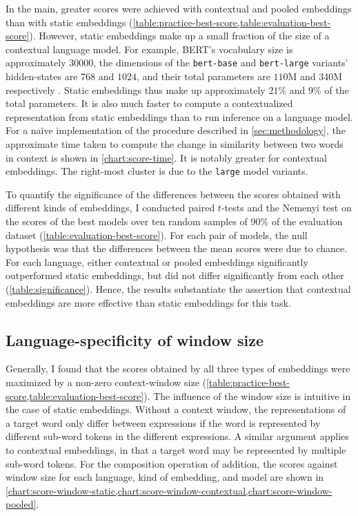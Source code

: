In the main, greater scores were achieved with contextual and pooled embeddings than
with static embeddings (\cref{table:practice-best-score,table:evaluation-best-score}).
However, static embeddings make up a small fraction of the size of a contextual
language model.
For example, BERT's vocabulary size is approximately $30000$, the dimensions of the
\texttt{bert-base} and \texttt{bert-large} variants' hidden-states are $768$ and
$1024$, and their total parameters are $110$M and $340$M respectively
\parencite[4173-4174]{Devlin2019}.
Static embeddings thus make up approximately $21$\% and $9$\% of the total parameters.
It is also much faster to compute a contextualized representation from static
embeddings than to run inference on a language model.
For a naïve implementation of the procedure described in \cref{sec:methodology}, the
approximate time taken to compute the change in similarity between two words in context
is shown in \cref{chart:score-time}.
It is notably greater for contextual embeddings.
The right-most cluster is due to the \texttt{large} model variants.



To quantify the significance of the differences between the scores obtained with
different kinds of embeddings, I conducted paired $t$-tests and the Nemenyi test
\parencites{Nemenyi1963}{Demsar2006} on the scores of the best models over ten random
samples of 90\% of the evaluation dataset (\cref{table:evaluation-best-score}).
For each pair of models, the null hypothesis was that the differences between the mean
scores were due to chance.
For each language, either contextual or pooled embeddings significantly outperformed
static embeddings, but did not differ significantly from each other
(\cref{table:significance}).
Hence, the results substantiate the assertion that contextual embeddings are more
effective than static embeddings for this task.



\subsection{Language-specificity of window size}
\label{sec:language-specificity}

Generally, I found that the scores obtained by all three types of embeddings were
maximized by a non-zero context-window size
(\cref{table:practice-best-score,table:evaluation-best-score}).
The influence of the window size is intuitive in the case of static embeddings.
Without a context window, the representations of a target word only differ between
expressions if the word is represented by different sub-word tokens in the different
expressions.
A similar argument applies to contextual embeddings, in that a target word may be
represented by multiple sub-word tokens.
For the composition operation of addition, the scores against window size for each
language, kind of embedding, and model are shown in
\cref{chart:score-window-static,chart:score-window-contextual,chart:score-window-pooled}.

